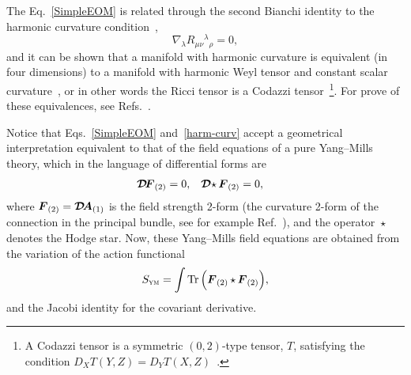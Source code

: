 \documentclass[aps,prd,12pt,twocolumn,superscriptaddress,showpacs,showkeys,reprint,longbibliography]{revtex4-1}
\newcommand{\cdf}[1][]{{\boldsymbol{\mathcal{D}}}{#1}\!}
\DeclareMathOperator{\st}{\star}
\newcommand{\Mi}{\mathcal{M}}
\newcommand{\Tr}{\operatorname{Tr}}
\renewcommand{\(}{\left(}
\renewcommand{\)}{\right)}
\renewcommand{\[}{\left[}
\renewcommand{\]}{\right]}
\begin{document}


The Eq.~\eqref{SimpleEOM} is related through the second Bianchi identity to the harmonic curvature condition~\cite{bourguignon1981varietes},
\begin{equation}
  \label{harm-curv}
  \nabla_\lambda R_{\mu\nu}{}^\lambda{}_\rho = 0,
\end{equation}
and it can be shown that a manifold with harmonic curvature is equivalent (in four dimensions) to a manifold with harmonic Weyl tensor and constant scalar curvature~\cite{Berger:1969}, or in other words the Ricci tensor is a Codazzi tensor~\footnote{A Codazzi tensor is a symmetric $(0,2)$-type tensor, $T$, satisfying the condition \mbox{$D_X T(Y,Z) = D_Y T(X,Z)$~\cite{Derdzinski01071983}.}}. For prove of these equivalences, see Refs.~\cite{Derdzinski:1985,Besse}.

Notice that Eqs.~\eqref{SimpleEOM} and~\eqref{harm-curv} accept a geometrical interpretation equivalent to that of the field equations of a pure Yang--Mills theory, which in the language of differential forms are
\begin{align}
  \cdf \Ff*[2] &= 0, & \cdf \st \Ff*[2] &= 0,
\end{align}
where $\Ff*[2] = \cdf \Af*[1]$ is the field strength 2-form (the curvature 2-form of the connection in the principal bundle, see for example Ref.~\cite{bourguignon1982yang,Nakahara}), and the operator $\st$ denotes the Hodge star. Now, these Yang--Mills field equations are obtained from the variation of the action functional
\begin{equation}
  S_{\textsc{ym}} = \int \Tr \Big( \Ff*[2] \st \Ff*[2] \Big),
\end{equation}
and the Jacobi identity for the covariant derivative.
\end{document}
